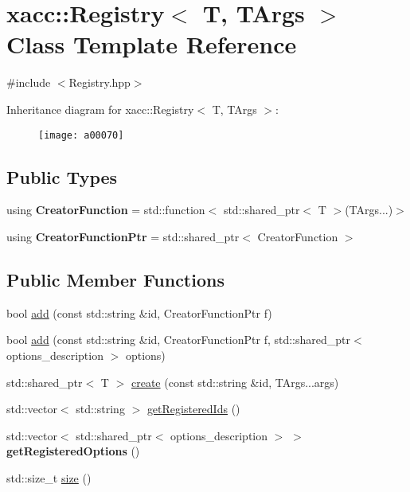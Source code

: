 \hypertarget{a00070}{}\section{xacc\+:\+:Registry$<$ T, T\+Args $>$ Class Template Reference}
\label{a00070}


{\ttfamily \#include $<$Registry.\+hpp$>$}

Inheritance diagram for xacc\+:\+:Registry$<$ T, T\+Args $>$\+:\begin{figure}[H]
\begin{center}
\leavevmode
\texttt{[image: a00070]}
\end{center}
\end{figure}
\subsection*{Public Types}
\begin{DoxyCompactItemize}
\item 
using {\bfseries Creator\+Function} = std\+::function$<$ std\+::shared\+\_\+ptr$<$ T $>$(T\+Args...)$>$\hypertarget{a00070_a784134d683dee924996e12d32a6da16c}{}\label{a00070_a784134d683dee924996e12d32a6da16c}

\item 
using {\bfseries Creator\+Function\+Ptr} = std\+::shared\+\_\+ptr$<$ Creator\+Function $>$\hypertarget{a00070_a2e7d22d66dcc4644e01bcc398a3e23cc}{}\label{a00070_a2e7d22d66dcc4644e01bcc398a3e23cc}

\end{DoxyCompactItemize}
\subsection*{Public Member Functions}
\begin{DoxyCompactItemize}
\item 
bool \hyperlink{a00070_a5ec7144ddc944674313badd32452fecc}{add} (const std\+::string \&id, Creator\+Function\+Ptr f)
\item 
bool \hyperlink{a00070_a51d98b5cf6e2722655a2f597b436aa80}{add} (const std\+::string \&id, Creator\+Function\+Ptr f, std\+::shared\+\_\+ptr$<$ options\+\_\+description $>$ options)
\item 
std\+::shared\+\_\+ptr$<$ T $>$ \hyperlink{a00070_aecccbd5534276cbdd1553e43c942219b}{create} (const std\+::string \&id, T\+Args...\+args)
\item 
std\+::vector$<$ std\+::string $>$ \hyperlink{a00070_a8bff6f5c50534375abc4026662d69d2e}{get\+Registered\+Ids} ()
\item 
std\+::vector$<$ std\+::shared\+\_\+ptr$<$ options\+\_\+description $>$ $>$ {\bfseries get\+Registered\+Options} ()\hypertarget{a00070_ad1fef83142cd38d0727471c15507a0ea}{}\label{a00070_ad1fef83142cd38d0727471c15507a0ea}

\item 
std\+::size\+\_\+t \hyperlink{a00070_a2352dd7c6c85ae5c5e232b577dfa2544}{size} ()
\end{DoxyCompactItemize}
